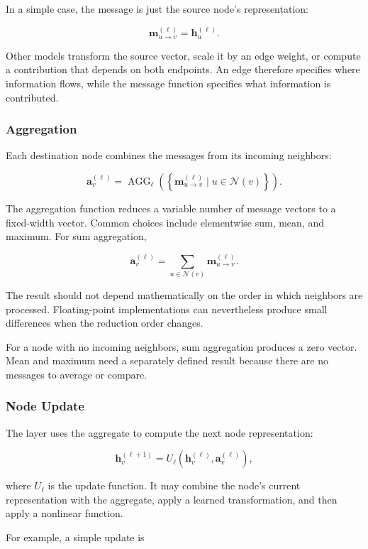 In a simple case, the message is just the source node's representation:

\[
  \mathbf{m}_{u\rightarrow v}^{(\ell)}=\mathbf{h}_u^{(\ell)}.
\]

Other models transform the source vector, scale it by an edge weight, or compute a contribution that depends on both endpoints. An edge therefore specifies where information flows, while the message function specifies what information is contributed.

\subsubsection{Aggregation}

Each destination node combines the messages from its incoming neighbors:

\[
  \mathbf{a}_v^{(\ell)}
  = \operatorname{AGG}_\ell\left(
    \left\{\mathbf{m}_{u\rightarrow v}^{(\ell)}\mid u\in\mathcal{N}(v)\right\}
    \right).
\]

The aggregation function reduces a variable number of message vectors to a fixed-width vector. Common choices include elementwise sum, mean, and maximum. For sum aggregation,

\[
  \mathbf{a}_v^{(\ell)}
  = \sum_{u\in\mathcal{N}(v)}\mathbf{m}_{u\rightarrow v}^{(\ell)}.
\]

The result should not depend mathematically on the order in which neighbors are processed. Floating-point implementations can nevertheless produce small differences when the reduction order changes.

For a node with no incoming neighbors, sum aggregation produces a zero vector. Mean and maximum need a separately defined result because there are no messages to average or compare.

\subsubsection{Node Update}

The layer uses the aggregate to compute the next node representation:

\[
  \mathbf{h}_v^{(\ell+1)}
  = U_\ell\left(\mathbf{h}_v^{(\ell)},\mathbf{a}_v^{(\ell)}\right),
\]

where $U_\ell$ is the update function. It may combine the node's current representation with the aggregate, apply a learned transformation, and then apply a nonlinear function.

For example, a simple update is

